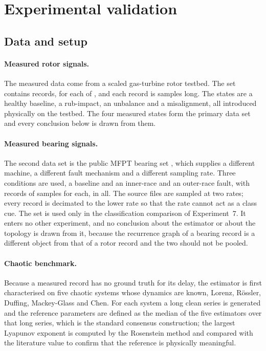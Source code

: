 \documentclass[10pt,a4paper,twocolumn]{article}
\begin{document}
\section{Experimental validation}
\label{sec:exp}

\subsection{Data and setup}
\label{sec:setup}

\paragraph{Measured rotor signals.}
The measured data come from a scaled gas-turbine rotor testbed.  The set
contains \nSignals{} records, \nPerClass{} for each of \nClassNames{}, and
each record is \nPts{} samples long.  The states are a healthy baseline, a
rub-impact, an unbalance and a misalignment, all introduced physically on the
testbed.  The four measured states form the primary data set and every
conclusion below is drawn from them.

\paragraph{Measured bearing signals.}
The second data set is the public MFPT bearing set \citep{bechhoefer2013},
which supplies a different
machine, a different fault mechanism and a different sampling rate.  Three
conditions are used, a baseline and an inner-race and an outer-race fault, with
\nMfptPerClass{} records of \nMfptPts{} samples for each, \nMfptSignals{} in
all.  The source files are sampled at two rates; every record is decimated to
the lower rate so that the rate cannot act as a class cue.  The set is used
only in the classification comparison of Experiment~7.  It enters no other
experiment, and no conclusion about the estimator or about the topology is
drawn from it, because the recurrence graph of a bearing record is a different
object from that of a rotor record and the two should not be pooled.

\paragraph{Chaotic benchmark.}
Because a measured record has no ground truth for its delay, the estimator is
first characterised on five chaotic systems whose dynamics are known,
Lorenz, R\"ossler, Duffing, Mackey-Glass and Chen.  For each system a long
clean series is generated and the reference parameters are defined as the
median of the five estimators over that long series, which is the standard
consensus construction; the largest Lyapunov exponent is computed by the
Rosenstein method \citep{rosenstein1993} and compared with the literature
value to confirm that the reference is physically meaningful.
\end{document}

